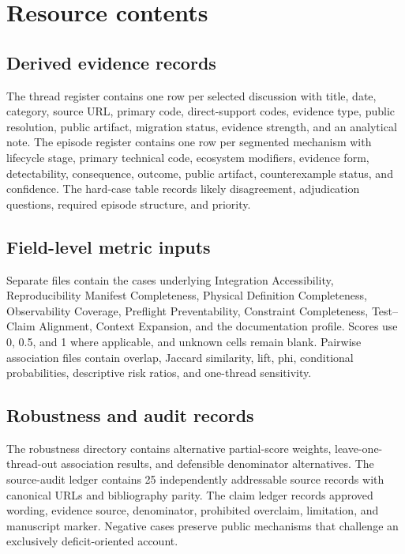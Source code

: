 \section{Resource contents}

\subsection{Derived evidence records}

The thread register contains one row per selected discussion with title, date, category, source URL, primary code, direct-support codes, evidence type, public resolution, public artifact, migration status, evidence strength, and an analytical note. The episode register contains one row per segmented mechanism with lifecycle stage, primary technical code, ecosystem modifiers, evidence form, detectability, consequence, outcome, public artifact, counterexample status, and confidence. The hard-case table records likely disagreement, adjudication questions, required episode structure, and priority.

\subsection{Field-level metric inputs}

Separate files contain the cases underlying Integration Accessibility, Reproducibility Manifest Completeness, Physical Definition Completeness, Observability Coverage, Preflight Preventability, Constraint Completeness, Test--Claim Alignment, Context Expansion, and the documentation profile. Scores use 0, 0.5, and 1 where applicable, and unknown cells remain blank. Pairwise association files contain overlap, Jaccard similarity, lift, phi, conditional probabilities, descriptive risk ratios, and one-thread sensitivity.

\subsection{Robustness and audit records}

The robustness directory contains alternative partial-score weights, leave-one-thread-out association results, and defensible denominator alternatives. The source-audit ledger contains 25 independently addressable source records with canonical URLs and bibliography parity. The claim ledger records approved wording, evidence source, denominator, prohibited overclaim, limitation, and manuscript marker. Negative cases preserve public mechanisms that challenge an exclusively deficit-oriented account.

